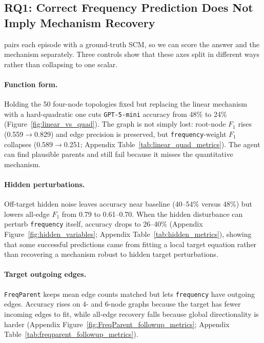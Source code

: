 \subsection{RQ1: Correct Frequency Prediction Does Not Imply Mechanism Recovery}
\label{sec:rq1-dissociation}

\projectname{} pairs each episode with a ground-truth SCM, so we can score the
answer and the mechanism separately. Three controls show that these axes split
in different ways rather than collapsing to one scalar.

\paragraph{Function form.}
Holding the 50 four-node topologies fixed but replacing the linear mechanism
with a hard-quadratic one cuts \texttt{GPT-5-mini} accuracy from 48\% to 24\%
(Figure~\ref{fig:linear_vs_quad}).
The graph is not simply lost: root-node $F_1$ rises (0.559$\to$0.829) and edge
precision is preserved, but \texttt{frequency}-weight $F_1$ collapses
(0.589$\to$0.251; Appendix Table~\ref{tab:linear_quad_metrics}). The agent can
find plausible parents and still fail because it misses the quantitative
mechanism.

\paragraph{Hidden perturbations.}
Off-target hidden noise leaves accuracy near baseline (40--54\% versus 48\%)
but lowers all-edge $F_1$ from 0.79 to 0.61--0.70. When the hidden disturbance
can perturb \texttt{frequency} itself, accuracy drops to 26--40\%
(Appendix Figure~\ref{fig:hidden_variables};
Appendix Table~\ref{tab:hidden_metrics}), showing that some successful
predictions came from fitting a local target equation rather than recovering a
mechanism robust to hidden target perturbations.

\paragraph{Target outgoing edges.}
\texttt{FreqParent} keeps mean edge counts matched but lets
\texttt{frequency} have outgoing edges. Accuracy rises on 4- and 6-node graphs
because the target has fewer incoming edges to fit, while all-edge recovery
falls because global directionality is harder
(Appendix Figure~\ref{fig:FreqParent_followup_metrics};
Appendix Table~\ref{tab:freqparent_followup_metrics}).

